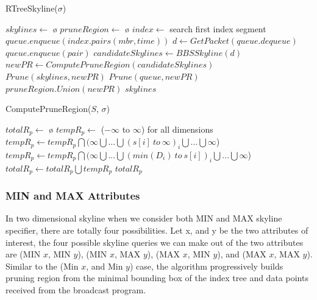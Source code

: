 \documentclass{sig-alternate}
\begin{document}
\begin{algorithm}
\caption{RTreeSkyline($\sigma$)}
\label{alg:RTreeSkyline}
\begin{algorithmic}[1]

\STATE $skylines \gets$ \o
\STATE $pruneRegion \gets$ \o
\STATE $index \gets$ search first index segment
\STATE $queue.enqueue(index.pairs(mbr, time))$
	\STATE $d \gets GetPacket(queue.dequeue)$
				\STATE $queue.enqueue(pair)$
			\ENDIF
		\ENDFOR
	\ELSE
		\STATE $candidateSkylines \gets BBSSkyline(d)$
		\STATE $newPR \gets ComputePruneRegion(candidateSkylines)$
		\STATE $Prune(skylines, newPR)$
		\STATE $Prune(queue, newPR)$
		\STATE $pruneRegion.Union(newPR)$
	\ENDIF
\ENDWHILE
\RETURN $skylines$
\end{algorithmic}
\end{algorithm}

\begin{algorithm}
\caption{ComputePruneRegion($S$, $\sigma$)}
\label{alg:ComputePruneRegion1}
\begin{algorithmic}[1]

\STATE $totalR_p \gets$ \o
{}
    \STATE $tempR_p \gets$ ($-\infty$ to $\infty$) for all dimensions
            \STATE $tempR_p \gets tempR_p \bigcap (\infty \bigcup ... \bigcup (s[i]~to~\infty)_i \bigcup ... \bigcup \infty $)
        \ELSE
            \STATE $tempR_p \gets tempR_p \bigcap (\infty \bigcup ... \bigcup (min(D_i)~to~s[i])_i \bigcup ... \bigcup \infty $)
        \ENDIF
    \ENDFOR
    \STATE $totalR_p \gets totalR_p \bigcup tempR_p$
\ENDFOR
\RETURN $totalR_p$
\end{algorithmic}
\end{algorithm}
\subsubsection{MIN and MAX Attributes}
In two dimensional skyline when we consider both MIN and MAX skyline
specifier, there are totally four possibilities. Let x, and y be the
two attributes of interest, the four possible skyline queries we can
make out of the two attributes are (MIN $x$, MIN $y$), (MIN $x$, MAX $y$),
(MAX $x$, MIN $y$), and (MAX $x$, MAX $y$).
Similar to the (Min $x$, and Min $y$) case, the algorithm progressively
builds pruning region from the minimal bounding box of the index tree
and data points received from the broadcast program.
\end{document}
